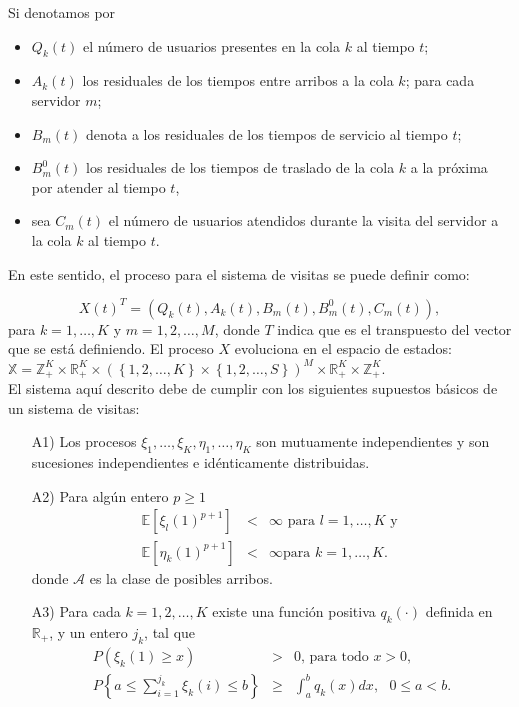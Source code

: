 \documentclass{article}
\newcommand{\ent}{\mathbb{Z}}
\newcommand{\rea}{\mathbb{R}}
\newcommand{\esp}{\mathbb{E}}
\begin{document}
Si denotamos por
\begin{itemize}
\item $Q_{k}\left(t\right)$ el n\'umero de usuarios presentes en
la cola $k$ al tiempo $t$; \item $A_{k}\left(t\right)$ los
residuales de los tiempos entre arribos a la cola $k$; para cada
servidor $m$; \item $B_{m}\left(t\right)$ denota a los residuales
de los tiempos de servicio al tiempo $t$; \item
$B_{m}^{0}\left(t\right)$ los residuales de los tiempos de
traslado de la cola $k$ a la pr\'oxima por atender al tiempo $t$,

\item sea
$C_{m}\left(t\right)$ el n\'umero de usuarios atendidos durante la
visita del servidor a la cola $k$ al tiempo $t$.
\end{itemize}


En este sentido, el proceso para el sistema de visitas se puede definir como:

\begin{equation}\label{Esp.Edos.Down}
X\left(t\right)^{T}=\left(Q_{k}\left(t\right),A_{k}\left(t\right),B_{m}\left(t\right),B_{m}^{0}\left(t\right),C_{m}\left(t\right)\right),
\end{equation}
para $k=1,\ldots,K$ y $m=1,2,\ldots,M$, donde $T$ indica que es el transpuesto del vector que se est\'a definiendo. El proceso $X$ evoluciona en el espacio de estados: $\mathbb{X}=\ent_{+}^{K}\times\rea_{+}^{K}\times\left(\left\{1,2,\ldots,K\right\}\times\left\{1,2,\ldots,S\right\}\right)^{M}\times\rea_{+}^{K}\times\ent_{+}^{K}$.\\

El sistema aqu\'i descrito debe de cumplir con los siguientes supuestos b\'asicos de un sistema de visitas:
\begin{itemize}
\item[A1)] Los procesos $\xi_{1},\ldots,\xi_{K},\eta_{1},\ldots,\eta_{K}$ son mutuamente independientes y son sucesiones independientes e id\'enticamente
distribuidas.

\item[A2)] Para alg\'un entero $p\geq1$
\begin{eqnarray*}
\esp\left[\xi_{l}\left(1\right)^{p+1}\right]&<&\infty\textrm{ para }l=1,\ldots,K\textrm{ y }\\
\esp\left[\eta_{k}\left(1\right)^{p+1}\right]&<&\infty\textrm{
para }k=1,\ldots,K.
\end{eqnarray*}
donde $\mathcal{A}$ es la clase de posibles arribos.

\item[A3)] Para cada $k=1,2,\ldots,K$ existe una funci\'on positiva $q_{k}\left(\cdot\right)$ definida en $\rea_{+}$, y un entero $j_{k}$, tal que
\begin{eqnarray}
P\left(\xi_{k}\left(1\right)\geq x\right)&>&0\textrm{, para todo }x>0,\\
P\left\{a\leq\sum_{i=1}^{j_{k}}\xi_{k}\left(i\right)\leq
b\right\}&\geq&\int_{a}^{b}q_{k}\left(x\right)dx, \textrm{ }0\leq
a<b.
\end{eqnarray}
\end{itemize}
\end{document}
